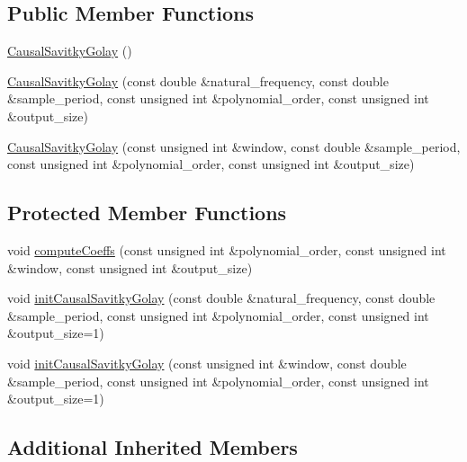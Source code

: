 \subsection*{Public Member Functions}
\begin{DoxyCompactItemize}
\item 
\hyperlink{classeigen__control__toolbox_1_1_causal_savitky_golay_aa5b6f458809b32f7a0917e00b30cdb40}{Causal\+Savitky\+Golay} ()
\item 
\hyperlink{classeigen__control__toolbox_1_1_causal_savitky_golay_a3c39b268b53253546ba1a6ab3e1e153d}{Causal\+Savitky\+Golay} (const double \&natural\+\_\+frequency, const double \&sample\+\_\+period, const unsigned int \&polynomial\+\_\+order, const unsigned int \&output\+\_\+size)
\item 
\hyperlink{classeigen__control__toolbox_1_1_causal_savitky_golay_a5b12da27b45af4260d4047708c222965}{Causal\+Savitky\+Golay} (const unsigned int \&window, const double \&sample\+\_\+period, const unsigned int \&polynomial\+\_\+order, const unsigned int \&output\+\_\+size)
\end{DoxyCompactItemize}
\subsection*{Protected Member Functions}
\begin{DoxyCompactItemize}
\item 
void \hyperlink{classeigen__control__toolbox_1_1_causal_savitky_golay_a19c0cd9221aa9239165353c1eb7331e7}{compute\+Coeffs} (const unsigned int \&polynomial\+\_\+order, const unsigned int \&window, const unsigned int \&output\+\_\+size)
\item 
void \hyperlink{classeigen__control__toolbox_1_1_causal_savitky_golay_a4ccf9e0eb474e04b81537f62ac84c96d}{init\+Causal\+Savitky\+Golay} (const double \&natural\+\_\+frequency, const double \&sample\+\_\+period, const unsigned int \&polynomial\+\_\+order, const unsigned int \&output\+\_\+size=1)
\item 
void \hyperlink{classeigen__control__toolbox_1_1_causal_savitky_golay_ae9a466e6bd02cc5cc009d449b6720374}{init\+Causal\+Savitky\+Golay} (const unsigned int \&window, const double \&sample\+\_\+period, const unsigned int \&polynomial\+\_\+order, const unsigned int \&output\+\_\+size=1)
\end{DoxyCompactItemize}
\subsection*{Additional Inherited Members}


